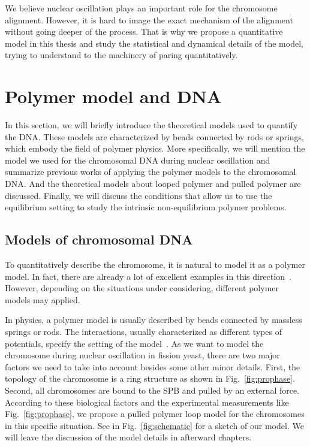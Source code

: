 We believe nuclear oscillation plays an important role for the chromosome alignment. However, it is hard to image the exact mechanism of the alignment without going deeper of the process. That is why we propose a quantitative model in this thesis and study the statistical and dynamical details of the model, trying to understand to the machinery of paring quantitatively. 


\section{Polymer model and DNA}
\label{sec:polymer_model_and_dna}
In this section, we will briefly introduce the theoretical models used to quantify the DNA. These models are characterized by beads connected by rods or springs, which embody the field of polymer physics. More specifically, we will mention the model we used for the chromosomal DNA during nuclear oscillation and summarize previous works of applying the polymer models to the chromosomal DNA. And the theoretical models about looped polymer and pulled polymer are discussed. Finally, we will discuss the conditions that allow us to use the equilibrium setting to study the intrinsic non-equilibrium polymer problems.  

\subsection{Models of chromosomal DNA}
\label{sub:models_of_chromosomal_dna}


To quantitatively describe the chromosome, it is natural to model it as a polymer model. In fact, there are already a lot of excellent examples in this direction~\cite{Wong2013,Tree2013,Halverson2014,Jun2010a}. However, depending on the situations under considering, different polymer models may applied. 

In physics, a polymer model is usually described by beads connected by massless springs or rods. The interactions, usually characterized as different types of potentials, specify the setting of the model~\cite{Doi1988}. As we want to model the chromosome during nuclear oscillation in fission yeast, there are two major factors we need to take into account besides some other minor details. First, the topology of the chromosome is a ring structure as shown in Fig.~\ref{fig:prophase}. Second, all chromosomes are bound to the SPB and pulled by an external force. According to these biological factors and the experimental measurements like Fig.~\ref{fig:prophase}, we propose a pulled polymer loop model for the chromosomes in this specific situation. See in Fig.~\ref{fig:schematic} for a sketch of our model. We will leave the discussion of the model details in afterward chapters.


